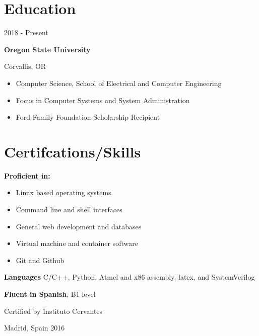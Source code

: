 \documentclass[12pt,letterpaper]{article}
\begin{document}
	\noindent
	\begin{minipage}[t]{0.45\linewidth}

	\section*{Education}
	2018 - Present
	
	\textbf{Oregon State University}

	Corvallis, OR
    
    \begin{itemize}
        \item Computer Science, School of Electrical and Computer Engineering
        \item Focus in Computer Systems and System Administration
        \item Ford Family Foundation Scholarship Recipient
        
        
    \end{itemize}

    \section*{Certifcations/Skills}

	\textbf{Proficient in:} 
	\begin{itemize}
		\item Linux based operating systems
		\item Command line and shell interfaces
		\item General web development and databases
		\item Virtual machine and container software
		\item Git and Github
	\end{itemize}
	\vspace{0.5cm}
	
	\textbf{Languages}
	C/C++, Python, Atmel and x86 assembly, latex, and SystemVerilog
	\vspace{0.5cm}

	\textbf{Fluent in Spanish}, B1 level

	Certified by Instituto Cervantes

	Madrid, Spain 2016

	\end{minipage}
	\hspace{1cm}
\end{document}
